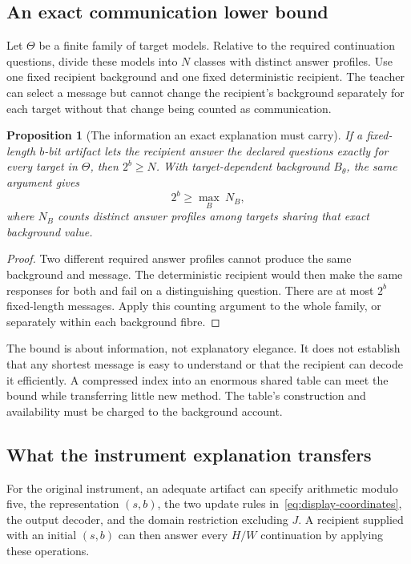 \documentclass[11pt,letterpaper]{article}
\theoremstyle{plain}
\newtheorem{proposition}[theorem]{Proposition}
\theoremstyle{definition}
\begin{document}
\subsection{An exact communication lower bound}
Let $\Theta$ be a finite family of target models. Relative to the required continuation questions, divide these models into $N$ classes with distinct answer profiles. Use one fixed recipient background and one fixed deterministic recipient. The teacher can select a message but cannot change the recipient's background separately for each target without that change being counted as communication.

\begin{proposition}[The information an exact explanation must carry]\label{prop:explanation}
If a fixed-length $b$-bit artifact lets the recipient answer the declared questions exactly for every target in $\Theta$, then $2^b\geq N$. With target-dependent background $B_\theta$, the same argument gives
\[
2^b\geq\max_{B}\ N_B,
\]
where $N_B$ counts distinct answer profiles among targets sharing that exact background value.
\end{proposition}
\begin{proof}
Two different required answer profiles cannot produce the same background and message. The deterministic recipient would then make the same responses for both and fail on a distinguishing question. There are at most $2^b$ fixed-length messages. Apply this counting argument to the whole family, or separately within each background fibre.
\end{proof}
The bound is about information, not explanatory elegance. It does not establish that any shortest message is easy to understand or that the recipient can decode it efficiently. A compressed index into an enormous shared table can meet the bound while transferring little new method. The table's construction and availability must be charged to the background account.

\subsection{What the instrument explanation transfers}
For the original instrument, an adequate artifact can specify arithmetic modulo five, the representation $(s,b)$, the two update rules in~\eqref{eq:display-coordinates}, the output decoder, and the domain restriction excluding $J$. A recipient supplied with an initial $(s,b)$ can then answer every $H/W$ continuation by applying these operations.
\end{document}
